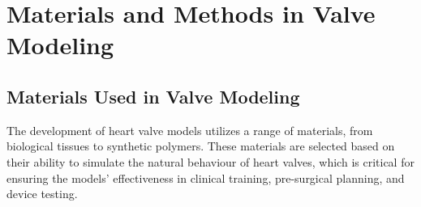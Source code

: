\section{Materials and Methods in Valve Modeling}

\subsection{Materials Used in Valve Modeling}
The development of heart valve models utilizes a range of materials, from biological tissues to synthetic polymers. These materials are selected based on their ability to simulate the natural behaviour of heart valves, which is critical for ensuring the models' effectiveness in clinical training, pre-surgical planning, and device testing.
